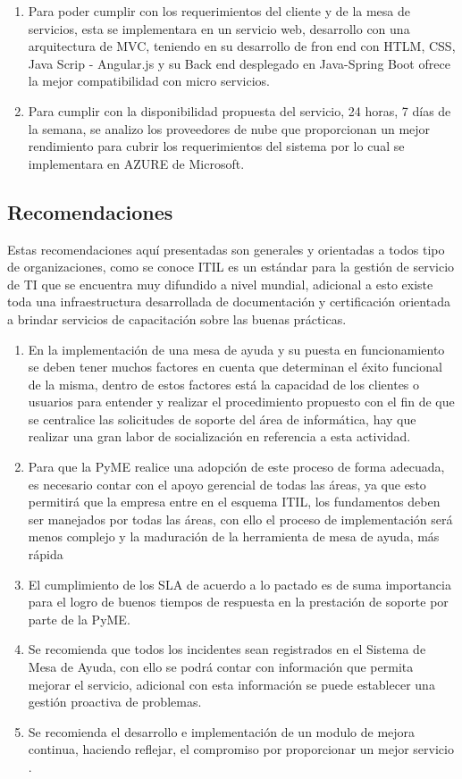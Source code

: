 \begin{enumerate}[1.]
\item Para poder cumplir con los requerimientos del cliente y de la mesa de servicios, esta  se implementara en un servicio web, desarrollo con una arquitectura de MVC, teniendo en su desarrollo de fron end con HTLM,  CSS, Java Scrip - Angular.js y su Back end desplegado en Java-Spring Boot ofrece la mejor compatibilidad con micro servicios.

\item Para cumplir con la disponibilidad propuesta del servicio, 24 horas, 7 días de la semana, se analizo los proveedores de nube que proporcionan un mejor rendimiento para cubrir  los requerimientos del sistema por lo cual se implementara en AZURE de Microsoft.




\end{enumerate}

\subsection{Recomendaciones}
Estas recomendaciones aquí presentadas son generales y orientadas a todos tipo
de organizaciones, como se conoce ITIL es un estándar para la gestión de servicio
de TI que se encuentra muy difundido a nivel mundial, adicional a esto existe toda
una infraestructura desarrollada de documentación y certificación orientada a
brindar servicios de capacitación sobre las buenas prácticas.
\begin{enumerate}[1.]
	\item En la implementación de una mesa de ayuda y su puesta en
	funcionamiento se deben tener muchos factores en cuenta que determinan
	el éxito funcional de la misma, dentro de estos factores está la capacidad
	de los clientes o usuarios para entender y realizar el procedimiento
	propuesto con el fin de que se centralice las solicitudes de soporte del área
	de informática, hay que realizar una gran labor de socialización en
	referencia a esta actividad.
	\item Para que la PyME realice una adopción de este proceso de forma adecuada,
	es necesario contar con el apoyo gerencial de todas las áreas, ya que esto
	permitirá que la empresa entre en el esquema ITIL, los fundamentos deben
	ser manejados por todas las áreas, con ello el proceso de implementación
	será menos complejo y la maduración de la herramienta de mesa de ayuda,
	más rápida
	\item El cumplimiento de los SLA de acuerdo a lo pactado es de suma
	importancia para el logro de buenos tiempos de respuesta en la prestación
	de soporte por parte de la PyME.
	\item Se recomienda que todos los incidentes sean registrados en el Sistema de
	Mesa de Ayuda, con ello se podrá contar con información que permita
	mejorar el servicio, adicional con esta información se puede establecer una
	gestión proactiva de problemas.
	\item Se recomienda el desarrollo e implementación de un modulo de mejora continua, haciendo reflejar, el compromiso por proporcionar un mejor servicio .
\end{enumerate}